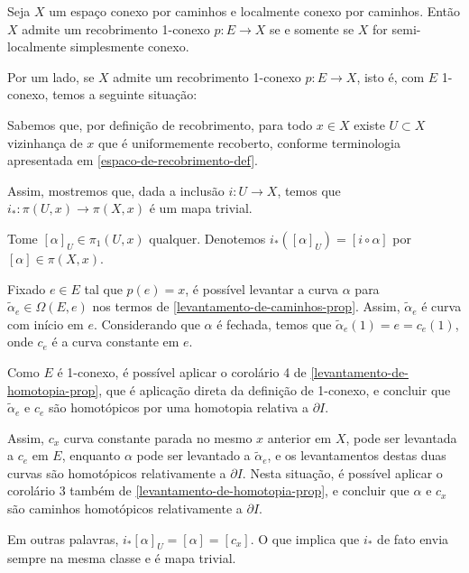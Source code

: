 \begin{thm}[Recobrimento 1-conexo]%
	Seja $X$ um espaço conexo por caminhos e localmente conexo por caminhos. Então $X$ admite um recobrimento 1-conexo $p:E\rightarrow X$ se e somente se $X$ for semi-localmente simplesmente conexo.\\
\end{thm}
\begin{dem}
    Por um lado, se $X$ admite um recobrimento 1-conexo $p:E\rightarrow X$, isto é, com $E$ 1-conexo, temos a seguinte situação:\newline

    Sabemos que, por definição de recobrimento, para todo $x\in X$ existe $U\subset X$ vizinhança de $x$ que é uniformemente recoberto, conforme terminologia apresentada em \ref{espaco-de-recobrimento-def}.

    Assim, mostremos que, dada a inclusão $i:U\rightarrow X$, temos que $i_*:\pi(U,x)\rightarrow \pi(X,x)$ é um mapa trivial.

    Tome $[\alpha]_U \in \pi_1(U,x)$ qualquer. Denotemos $i_*([\alpha]_U)=[i\circ \alpha]$ por $[\alpha]\in \pi(X,x)$.

    Fixado $e\in E$ tal que $p(e)=x$, é possível levantar a curva $\alpha$ para $\tilde{\alpha}_e\in \Omega (E,e)$ nos termos de \ref{levantamento-de-caminhos-prop}. Assim, $\tilde{\alpha}_e$ é  curva com início em $e$. Considerando que $\alpha$ é fechada, temos que $\tilde{\alpha}_e(1)=e=c_e(1)$, onde $c_e$ é a curva constante em $e$.

    Como $E$ é 1-conexo, é possível aplicar o corolário 4 de \ref{levantamento-de-homotopia-prop}, que é aplicação direta da definição de 1-conexo, e concluir que $\tilde{\alpha}_e$ e $c_e$ são homotópicos por uma homotopia relativa a $\partial I$.
    
    Assim, $c_x$ curva constante parada no mesmo $x$ anterior em $X$, pode ser levantada a $c_e$ em $E$, enquanto $\alpha$ pode ser levantado a $\tilde{\alpha}_e$, e os levantamentos destas duas curvas são homotópicos relativamente a $\partial I$. Nesta situação, é possível aplicar o corolário 3 também de \ref{levantamento-de-homotopia-prop}, e concluir que $\alpha$ e $c_x$ são caminhos homotópicos relativamente a $\partial I$.

    Em outras palavras, $i_*[\alpha]_U=[\alpha]=[c_x]$. O que implica que $i_*$ de fato envia sempre na mesma classe e é mapa trivial.\newline\newline





\end{dem}
